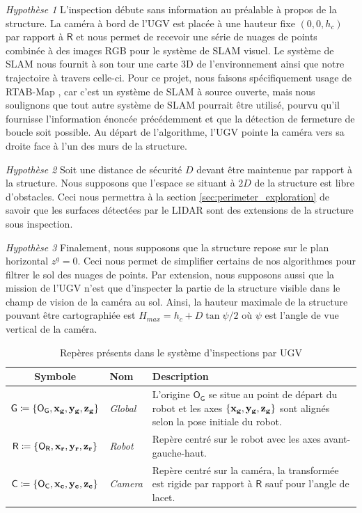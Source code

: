 \textit{Hypothèse 1} L'inspection débute sans information au préalable à propos de la structure. La caméra à bord de l'UGV est placée à une hauteur fixe $(0,0,h_c)$ par rapport à $\mathsf{R}$ et nous permet de recevoir une série de nuages de points combinée à des images RGB pour le système de SLAM visuel. Le système de SLAM nous fournit à son tour une carte 3D de l'environnement ainsi que notre trajectoire à travers celle-ci. Pour ce projet, nous faisons spécifiquement usage de RTAB-Map \citep{Labbe2014}, car c'est un système de SLAM à source ouverte, mais nous soulignons que tout autre système de SLAM pourrait être utilisé, pourvu qu'il fournisse l'information énoncée précédemment et que la détection de fermeture de boucle soit possible. Au départ de l'algorithme, l'UGV pointe la caméra vers sa droite face à l'un des murs de la structure.

\textit{Hypothèse 2} Soit une distance de sécurité $D$ devant être maintenue par rapport à la structure. Nous supposons que l'espace se situant à $2D$ de la structure est libre d'obstacles. Ceci nous permettra à la section \ref{sec:perimeter_exploration} de savoir que les surfaces détectées par le LIDAR sont des extensions de la structure sous inspection.

\textit{Hypothèse 3} Finalement, nous supposons que la structure repose sur le plan horizontal $z^g = 0$. Ceci nous permet de simplifier certains de nos algorithmes pour filtrer le sol des nuages de points. Par extension, nous supposons aussi que la mission de l'UGV n'est que d'inspecter la partie de la structure visible dans le champ de vision de la caméra au sol. Ainsi, la hauteur maximale de la structure pouvant être cartographiée est $H_{max} = h_c + D \tan{\psi/2}$ où $\psi$ est l'angle de vue vertical de la caméra.

\begin{table}[htp]
  \caption{Repères présents dans le système d'inspections par UGV}
  \centering
  \setlength{\tabcolsep}{12pt}
  \begin{tabular}[htp]{|c|l|p{9cm}|}
    \hline
    Symbole & Nom                   & Description\\\hline
    $\mathsf{G} \coloneqq \{\mathsf{O_G}, \mathbf{x_g}, \mathbf{y_g}, \mathbf{z_g} \} $     &  \textit{Global}      & L'origine $\mathsf{O_G}$ se situe au point de départ du robot et les axes $\{\mathbf{x_g}, \mathbf{y_g}, \mathbf{z_g} \}$ sont alignés selon la pose initiale du robot.\\\hline
    $\mathsf{R} \coloneqq \{\mathsf{O_R}, \mathbf{x_r}, \mathbf{y_r}, \mathbf{z_r} \} $     &  \textit{Robot}       & Repère centré sur le robot avec les axes avant-gauche-haut.\\\hline
    $\mathsf{C} \coloneqq \{\mathsf{O_C}, \mathbf{x_c}, \mathbf{y_c}, \mathbf{z_c} \}$     &  \textit{Camera}      & Repère centré sur la caméra, la transformée est rigide par rapport à $\mathsf{R}$ sauf pour l'angle de lacet. \\\hline
  \end{tabular}
  \setlength{\tabcolsep}{6pt}
  \label{table:ugv_frames}
\end{table}

